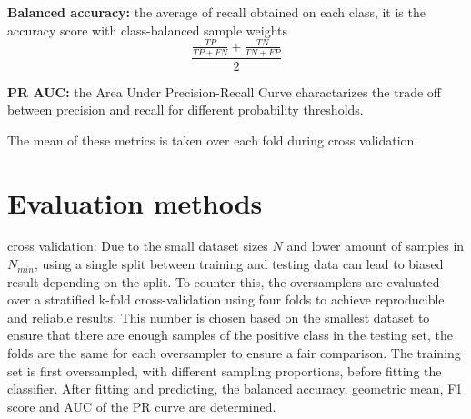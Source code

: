 \textbf{Balanced accuracy:} the average of recall obtained on each class, it is the accuracy score with class-balanced sample weights
\begin{equation}
    \frac{\frac{TP}{TP + FN} + \frac{TN}{TN + FP}}{2}
\end{equation}

\textbf{PR AUC:} the Area Under Precision-Recall Curve charactarizes the trade off between precision and recall for different probability thresholds. 

The mean of these metrics is taken over each fold during cross validation. 

\section{Evaluation methods}
cross validation: Due to the small dataset sizes $N$ and lower amount of samples in $N_{min}$, using a single split between training and testing data can lead to biased result depending on the split. To counter this, the oversamplers are evaluated over a stratified k-fold cross-validation using four folds to achieve reproducible and reliable results. This number is chosen based on the smallest dataset to ensure that there are enough samples of the positive class in the testing set, the folds are the same for each oversampler to ensure a fair comparison. The training set is first oversampled, with different sampling proportions, before fitting the classifier. After fitting and predicting, the balanced accuracy, geometric mean, F1 score and AUC of the PR curve are determined.